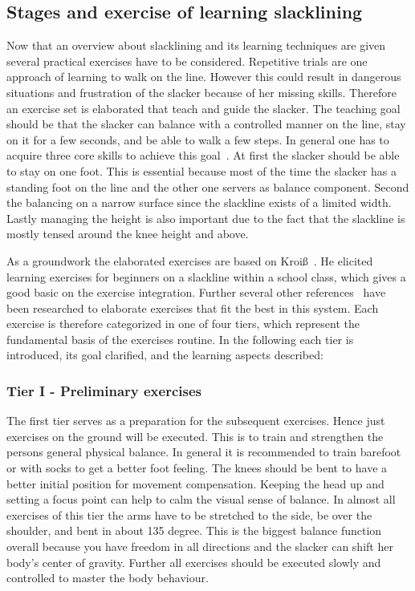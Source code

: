 \subsection{Stages and exercise of learning slacklining}\label{3_3_2_StagesExercises}
Now that an overview about slacklining and its learning techniques are given several practical exercises have to be considered. Repetitive trials are one approach of learning to walk on the line. However this could result in dangerous situations and frustration of the slacker because of her missing skills. Therefore an exercise set is elaborated that teach and guide the slacker. The teaching goal should be that the slacker can balance with a controlled manner on the line, stay on it for a few seconds, and be able to walk a few steps. In general one has to acquire three core skills to achieve this goal~\cite{Kroiss2007-ab}. At first the slacker should be able to stay on one foot. This is essential because most of the time the slacker has a standing foot on the line and the other one servers as balance component. Second the balancing on a narrow surface since the slackline exists of a limited width. Lastly managing the height is also important due to the fact that the slackline is mostly tensed around the knee height and above.

As a groundwork the elaborated exercises are based on Kroiß~\cite{Kroiss2007-ab}. He elicited learning exercises for beginners on a slackline within a school class, which gives a good basic on the exercise integration. Further several other references~\cite{Balcom2005-wl, Donath2013-kk, Donath2016-gm, Granacher2010-ow, Keller2012-xh, Kleindl2011-bl, Pfusterschmied2013-yy, Thomann2013-aa} have been researched to elaborate exercises that fit the best in this system. Each exercise is therefore categorized in one of four tiers, which represent the fundamental basis of the exercises routine. In the following each tier is introduced, its goal clarified, and the learning aspects described:

\subsubsection{Tier I - Preliminary exercises}
The first tier serves as a preparation for the subsequent exercises. Hence just exercises on the ground will be executed. This is to train and strengthen the persons general physical balance. In general it is recommended to train barefoot or with socks to get a better foot feeling. The knees should be bent to have a better initial position for movement compensation. Keeping the head up and setting a focus point can help to calm the visual sense of balance. In almost all exercises of this tier the arms have to be stretched to the side, be over the shoulder, and bent in about 135 degree. This is the biggest balance function overall because you have freedom in all directions and the slacker can shift her body's center of gravity. Further all exercises should be executed slowly and controlled to master the body behaviour.

